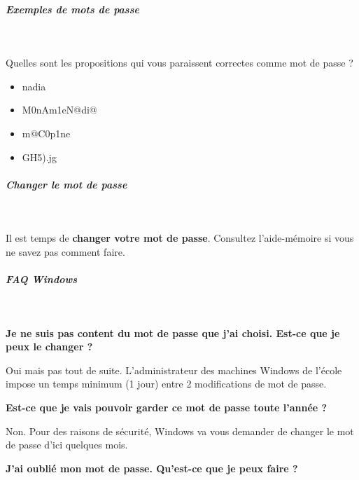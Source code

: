 \documentclass[11pt,a4paper]{article}
\begin{document}
		\subparagraph{Exemples de mots de passe} 
		
                \textcolor{white}{.} \par
            Quelles sont les propositions qui vous paraissent correctes comme mot de passe ?
						
            \begin{itemize} 
        
            \item[ \ding{"6F} ] nadia
        
            \item[ \ding{"6F} ] M0nAm1eN@di@
        
            \item[ \ding{"6F} ] m@C0p1ne
        
            \item[ \ding{"6F} ] GH5).jg
        
            \end{itemize} 
        
			
		\subparagraph{Changer le mot de passe} 
		
					\textcolor{white}{.} \par
				
            \par
        
					Il est  temps de 
					\textbf{changer votre mot de passe}.
					Consultez l'aide-m\'emoire si vous ne savez pas comment faire. 
				
            \par
        
			
		\subparagraph{FAQ Windows} 
		
					\textcolor{white}{.} \par
				
            \par
        \textbf{Je ne suis pas content du mot de passe que j'ai choisi. Est-ce que je peux le changer ?}
            \par
        Oui mais pas tout de suite. L'administrateur des machines Windows de l'\'ecole impose un temps minimum (1 jour) entre 2 modifications de mot de passe.
            \par
        \textbf{Est-ce que je vais pouvoir garder ce mot de passe toute l'ann\'ee ?}
            \par
        Non. Pour des raisons de s\'ecurit\'e, Windows va vous demander de changer le mot de passe d'ici quelques mois.
            \par
        \textbf{J'ai oubli\'e mon mot de passe. Qu'est-ce que je peux faire ?}
            \par
        
\end{document}
